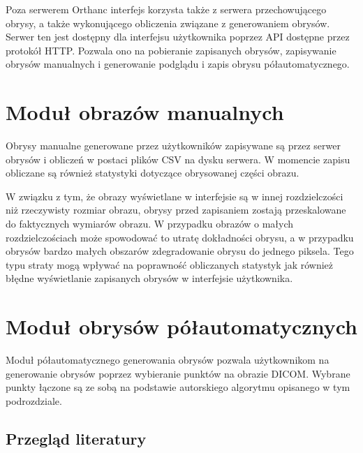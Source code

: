 \documentclass[a4paper,11pt,twoside,openright]{report}
\theoremstyle{definition}
\begin{document}
Poza serwerem Orthanc interfejs korzysta także z serwera przechowującego obrysy,
a także wykonującego obliczenia związane z generowaniem obrysów. Serwer ten jest
dostępny dla interfejsu użytkownika poprzez API dostępne przez protokół HTTP.
Pozwala ono na pobieranie zapisanych obrysów, zapisywanie obrysów manualnych i
generowanie podglądu i zapis obrysu półautomatycznego.

\section {Moduł obrazów manualnych}

Obrysy manualne generowane przez użytkowników zapisywane są przez serwer obrysów
i obliczeń w postaci plików CSV na dysku serwera. W momencie zapisu obliczane są
również statystyki dotyczące obrysowanej części obrazu.

W związku z tym, że obrazy wyświetlane w interfejsie są w innej rozdzielczości
niż rzeczywisty rozmiar obrazu, obrysy przed zapisaniem zostają przeskalowane do
faktycznych wymiarów obrazu. W przypadku obrazów o małych rozdzielczościach może
spowodować to utratę dokładności obrysu, a w przypadku obrysów bardzo małych
obszarów zdegradowanie obrysu do jednego piksela. Tego typu straty mogą wpływać
na poprawność obliczanych statystyk jak również błędne wyświetlanie zapisanych
obrysów w interfejsie użytkownika.

\section {Moduł obrysów półautomatycznych}

Moduł półautomatycznego generowania obrysów pozwala użytkownikom na generowanie
obrysów poprzez wybieranie punktów na obrazie DICOM. Wybrane punkty łączone są
ze sobą na podstawie autorskiego algorytmu opisanego w tym podrozdziale.

\subsection {Przegląd literatury}
\end{document}
